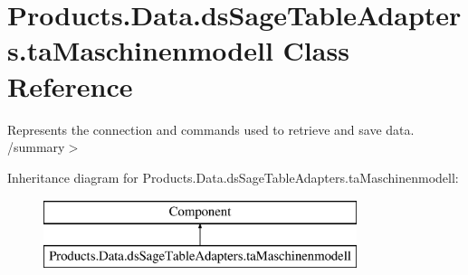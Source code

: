 \hypertarget{class_products_1_1_data_1_1ds_sage_table_adapters_1_1ta_maschinenmodell}{}\section{Products.\+Data.\+ds\+Sage\+Table\+Adapters.\+ta\+Maschinenmodell Class Reference}
\label{class_products_1_1_data_1_1ds_sage_table_adapters_1_1ta_maschinenmodell}


Represents the connection and commands used to retrieve and save data. /summary$>$  


Inheritance diagram for Products.\+Data.\+ds\+Sage\+Table\+Adapters.\+ta\+Maschinenmodell\+:\begin{figure}[H]
\begin{center}
\leavevmode
\includegraphics[height=2.000000cm]{class_products_1_1_data_1_1ds_sage_table_adapters_1_1ta_maschinenmodell}
\end{center}
\end{figure}
